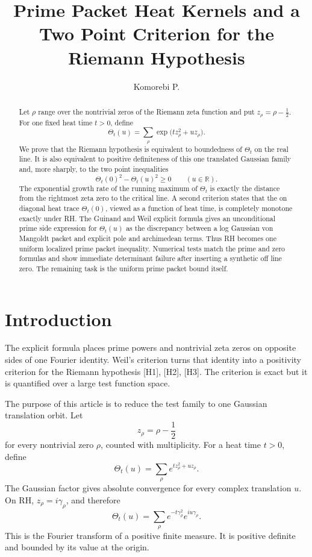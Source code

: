 \documentclass{aomart}
\title[Prime packet heat kernels]{Prime Packet Heat Kernels and a Two Point Criterion for the Riemann Hypothesis}
\author[Komorebi P.]{Komorebi P.}
\theoremstyle{definition}
\theoremstyle{remark}
\newcommand{\refcode}[1]{\textnormal{[#1]}}
\begin{document}
\begin{abstract}
Let \(\rho\) range over the nontrivial zeros of the Riemann zeta function and put \(z_\rho=\rho-\tfrac12\). For one fixed heat time \(t>0\), define
\[
 \Theta_t(u)=\sum_\rho \exp\bigl(tz_\rho^2+uz_\rho\bigr).
\]
We prove that the Riemann hypothesis is equivalent to boundedness of \(\Theta_t\) on the real line. It is also equivalent to positive definiteness of this one translated Gaussian family and, more sharply, to the two point inequalities
\[
 \Theta_t(0)^2-\Theta_t(u)^2\geq0
 \qquad(u\in\mathbb R).
\]
The exponential growth rate of the running maximum of \(\Theta_t\) is exactly the distance from the rightmost zeta zero to the critical line. A second criterion states that the on diagonal heat trace \(\Theta_t(0)\), viewed as a function of heat time, is completely monotone exactly under RH. The Guinand and Weil explicit formula gives an unconditional prime side expression for \(\Theta_t(u)\) as the discrepancy between a log Gaussian von Mangoldt packet and explicit pole and archimedean terms. Thus RH becomes one uniform localized prime packet inequality. Numerical tests match the prime and zero formulas and show immediate determinant failure after inserting a synthetic off line zero. The remaining task is the uniform prime packet bound itself.
\end{abstract}
\maketitle
\thispagestyle{plain}

\section{Introduction}\label{sec:introduction}

The explicit formula places prime powers and nontrivial zeta zeros on opposite sides of one Fourier identity. Weil's criterion turns that identity into a positivity criterion for the Riemann hypothesis \refcode{H1}, \refcode{H2}, \refcode{H3}. The criterion is exact but it is quantified over a large test function space.

The purpose of this article is to reduce the test family to one Gaussian translation orbit. Let
\[
 z_\rho=\rho-\frac12
\]
for every nontrivial zero \(\rho\), counted with multiplicity. For a heat time \(t>0\), define
\[
 \Theta_t(u)
 =
 \sum_\rho
 e^{tz_\rho^2+uz_\rho}.
\]
The Gaussian factor gives absolute convergence for every complex translation \(u\). On RH, \(z_\rho=i\gamma_\rho\), and therefore
\[
 \Theta_t(u)
 =
 \sum_\rho
 e^{-t\gamma_\rho^2}e^{iu\gamma_\rho}.
\]
This is the Fourier transform of a positive finite measure. It is positive definite and bounded by its value at the origin.
\end{document}
